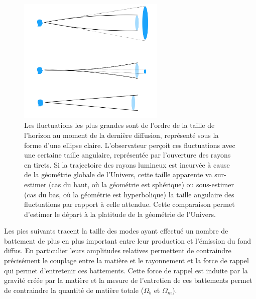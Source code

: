 \begin{figure}[htbp]
	\centering
		\includegraphics[height=6cm]{figs/cmb_geom.png}
		\caption[CMB et géométrie]{Les fluctuations les plus grandes sont de l'ordre de la taille de l'horizon au moment de la dernière diffusion, représenté sous la forme d'une ellipse claire. L'observateur perçoit ces fluctuations avec une certaine taille angulaire, représentée par l'ouverture des rayons en tirets. Si la trajectoire des rayons lumineux est incurvée à cause de la géométrie globale de l'Univers, cette taille apparente va sur-estimer (cas du haut, où la géométrie est sphérique) ou sous-estimer (cas du bas, où la géométrie est hyperbolique) la taille angulaire des fluctuations par rapport à celle attendue. Cette comparaison permet d'estimer le départ à la platitude de la géométrie de l'Univers.  }
	\label{f:cmb_geom}
\end{figure}

Les pics suivants tracent la taille des modes ayant effectué un nombre de battement de plus en plus important entre leur production et l'émission du fond diffus. En particulier leurs amplitudes relatives permettent de contraindre précisément le couplage entre la matière et le rayonnement et la force de rappel qui permet d'entretenir ces battements. Cette force de rappel est induite par la gravité créée par la matière et la mesure de l'entretien de ces battements permet de contraindre la quantité de matière totale ($\Omega_b$ et $\Omega_m$). 



